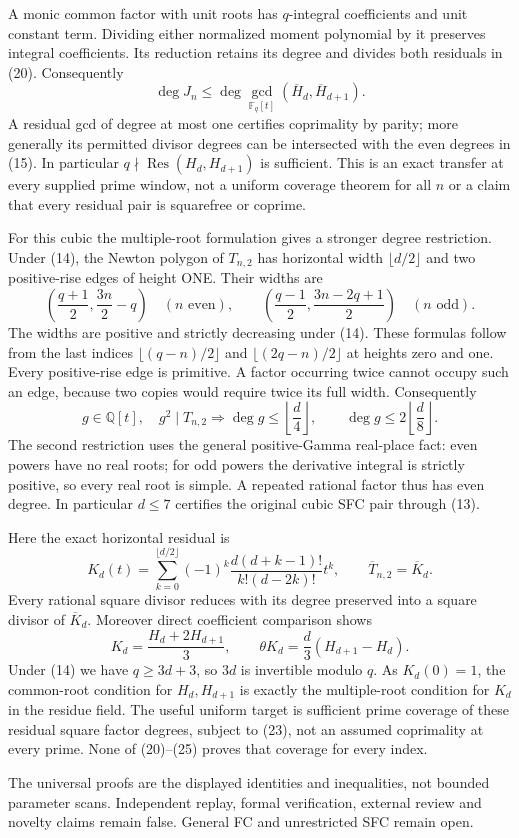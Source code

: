 \documentclass[11pt]{article}
\begin{document}
A monic common factor with unit roots has $q$-integral coefficients and
unit constant term. Dividing either normalized moment polynomial by it
preserves integral coefficients. Its reduction retains its degree and
divides both residuals in (20). Consequently
\[
 \deg J_n\le\deg\gcd_{\mathbb F_q[t]}(\overline H_d,
                                           \overline H_{d+1}). \tag{21}
\]
A residual gcd of degree at most one certifies coprimality by parity;
more generally its permitted divisor degrees can be intersected with
the even degrees in (15). In particular $q\nmid\operatorname{Res}(H_d,H_{d+1})$
is sufficient. This is an exact transfer at every supplied prime window,
not a uniform coverage theorem for all $n$ or a claim that every residual
pair is squarefree or coprime.

For this cubic the multiple-root formulation gives a stronger degree
restriction. Under (14), the Newton polygon of $T_{n,2}$ has horizontal
width $\lfloor d/2\rfloor$ and two positive-rise edges of height ONE.
Their widths are
\[
 \left(\frac{q+1}{2},\frac{3n}{2}-q\right)\quad(n\text{ even}),
 \qquad
 \left(\frac{q-1}{2},\frac{3n-2q+1}{2}\right)\quad(n\text{ odd}). \tag{22}
\]
The widths are positive and strictly decreasing under (14).
These formulas follow from the last indices
$\lfloor(q-n)/2\rfloor$ and $\lfloor(2q-n)/2\rfloor$ at heights zero
and one. Every positive-rise edge is primitive. A factor occurring twice
cannot occupy such an edge, because two copies would require twice
its full width. Consequently
\[
 g\in\mathbb Q[t],\quad g^2\mid T_{n,2}\Longrightarrow
 \deg g\le\left\lfloor\frac d4\right\rfloor,
 \qquad \deg g\le2\left\lfloor\frac d8\right\rfloor.        \tag{23}
\]
The second restriction uses the general positive-Gamma real-place fact:
even powers have no real roots; for odd powers the derivative integral
is strictly positive, so every real root is simple. A repeated rational
factor thus has even degree. In particular $d\le7$ certifies the original
cubic SFC pair through (13).

Here the exact horizontal residual is
\[
 K_d(t)=\sum_{k=0}^{\lfloor d/2\rfloor}
       (-1)^k\frac{d(d+k-1)!}{k!(d-2k)!}t^k,
                 \qquad\overline T_{n,2}=\overline K_d.  \tag{24}
\]
Every rational square divisor reduces with its degree preserved into a
square divisor of $\overline K_d$. Moreover direct coefficient comparison
shows
\[
 K_d=\frac{H_d+2H_{d+1}}3,\qquad
 \theta K_d=\frac d3(H_{d+1}-H_d).                         \tag{25}
\]
Under (14) we have $q\ge3d+3$, so $3d$ is invertible modulo $q$.
As $K_d(0)=1$, the common-root condition for $H_d,H_{d+1}$ is exactly
the multiple-root condition for $K_d$ in the residue field. The useful
uniform target is sufficient prime coverage of these residual square
factor degrees, subject to (23), not an assumed coprimality at every
prime. None of (20)--(25) proves that coverage for every index.

The universal proofs are the displayed identities and inequalities,
not bounded parameter scans.
Independent replay, formal verification, external review and novelty
claims remain false. General FC and unrestricted SFC remain open.
\end{document}
